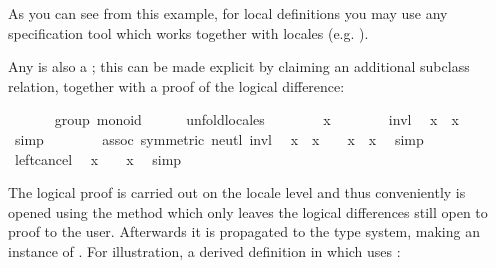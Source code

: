 \begin{isabellebody}
\begin{isamarkuptext}
  \noindent As you can see from this example, for local
  definitions you may use any specification tool
  which works together with locales (e.g. \cite{krauss2006}).%
\end{isamarkuptext}%
\isamarkuptrue%
%
\isamarkuptrue%
%
\begin{isamarkuptext}%
Any  is also a ;  this
  can be made explicit by claiming an additional subclass relation,
  together with a proof of the logical difference:%
\end{isamarkuptext}%
\isamarkuptrue%
\ \ \ \ \isamarkupfalse%
\ {\isacharparenleft}\ group{\isacharparenright}\ monoid\isanewline
%
\isadelimproof
\ \ \ \ %
\endisadelimproof
%
\isatagproof
{}\isamarkupfalse%
\ unfold{\isacharunderscore}locales\isanewline
\ \ \ \ \ \ \isamarkupfalse%
\ x\isanewline
\ \ \ \ \ \ \isamarkupfalse%
\ invl\ \isamarkupfalse%
\ {\isachardoublequoteopen}x{\isasymdiv}\ {\isasymotimes}\ x\ {\isacharequal}\ {\isasymone}{\isachardoublequoteclose}\ \isamarkupfalse%
\ simp\isanewline
\ \ \ \ \ \ \isamarkupfalse%
\ assoc\ {\isacharbrackleft}symmetric{\isacharbrackright}\ neutl\ invl\ \isamarkupfalse%
\ {\isachardoublequoteopen}x{\isasymdiv}\ {\isasymotimes}\ {\isacharparenleft}x\ {\isasymotimes}\ {\isasymone}{\isacharparenright}\ {\isacharequal}\ x{\isasymdiv}\ {\isasymotimes}\ x{\isachardoublequoteclose}\ \isamarkupfalse%
\ simp\isanewline
\ \ \ \ \ \ \isamarkupfalse%
\ left{\isacharunderscore}cancel\ \isamarkupfalse%
\ {\isachardoublequoteopen}x\ {\isasymotimes}\ {\isasymone}\ {\isacharequal}\ x{\isachardoublequoteclose}\ \isamarkupfalse%
\ simp\isanewline
\ \ \ \ \isamarkupfalse%
%
\endisatagproof
{\isafoldproof}%
%
\isadelimproof
%
\endisadelimproof
%
\begin{isamarkuptext}%
\noindent The logical proof is carried out on the locale level
  and thus conveniently is opened using the 
  method which only leaves the logical differences still
  open to proof to the user.  Afterwards it is propagated
  to the type system, making  an instance of
  .  For illustration, a derived definition
  in  which uses :%
\end{isamarkuptext}%
\isamarkuptrue%
\ \ \ \ \isamarkupfalse%

\end{isabellebody}
